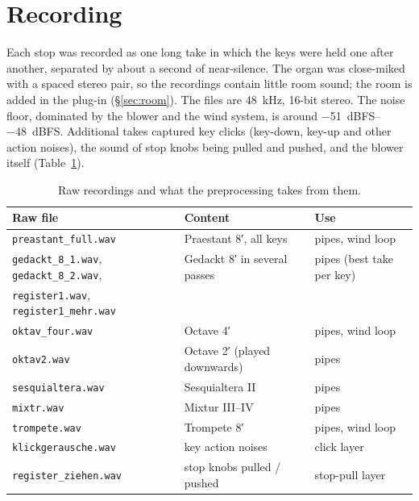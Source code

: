 \documentclass[11pt,a4paper,parskip=half,DIV=11,toc=bibliography]{scrartcl}
\newcommand{\fn}[1]{\mbox{\texttt{#1}}}
\begin{document}
\section{Recording}
\label{sec:recording}

Each stop was recorded as one long take in which the keys were held one after another, separated by
about a second of near-silence. The organ was close-miked with a spaced stereo pair, so the
recordings contain little room sound; the room is added in the plug-in (\S\ref{sec:room}). The files
are \SI{48}{kHz}, 16-bit stereo. The noise floor, dominated by the blower and the wind system, is
around \SIrange{-51}{-48}{dBFS}. Additional takes captured key clicks (key-down, key-up and other
action noises), the sound of stop knobs being pulled and pushed, and the blower itself
(Table~\ref{tab:raw}).

\begin{table}[h]
\centering\small
\begin{tabular}{@{}lll@{}}
\toprule
Raw file & Content & Use \\
\midrule
\fn{preastant\_full.wav}   & Praestant 8′, all keys       & pipes, wind loop \\
\fn{gedackt\_8\_1.wav}, \fn{gedackt\_8\_2.wav}, & Gedackt 8′ in several passes & pipes (best take per key) \\
\fn{register1.wav}, \fn{register1\_mehr.wav} & & \\
\fn{oktav\_four.wav}       & Octave 4′                    & pipes, wind loop \\
\fn{oktav2.wav}            & Octave 2′ (played downwards) & pipes \\
\fn{sesquialtera.wav}      & Sesquialtera II              & pipes \\
\fn{mixtr.wav}             & Mixtur III--IV               & pipes \\
\fn{trompete.wav}          & Trompete 8′                  & pipes, wind loop \\
\fn{klickgerausche.wav}    & key action noises            & click layer \\
\fn{register\_ziehen.wav}  & stop knobs pulled / pushed   & stop-pull layer \\
\bottomrule
\end{tabular}
\caption{Raw recordings and what the preprocessing takes from them.}
\label{tab:raw}
\end{table}
\end{document}
